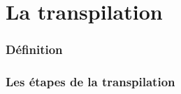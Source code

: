 \section{La transpilation}

\begin{frame}
    \frametitle{Définition}
    
\end{frame}


\begin{frame}

    \frametitle{Les étapes de la transpilation}

   
\end{frame}

